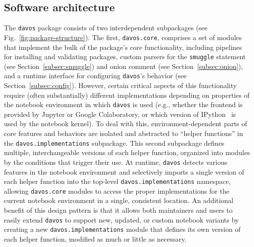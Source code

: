 \documentclass[preprint,12pt,a4paper]{elsarticle}
\newcommand{\comment}[1]{}
\begin{document}
\subsection{Software architecture}
The \texttt{davos} package consists of two interdependent subpackages (see Fig.~\ref{fig:package-structure}). The first, \texttt{davos.core}, comprises a set of modules that implement\comment{provide?} the bulk of the package's core functionality, including pipelines for installing and validating packages, custom parsers for the \texttt{smuggle} statement (see Section~\ref{subsec:smuggle}) and onion comment (see Section~\ref{subsec:onion}), and a runtime interface for configuring \texttt{davos}'s behavior (see Section~\ref{subsec:config}). However, certain critical\comment{other important} aspects of this functionality require (often substantially) different implementations depending on properties of the notebook environment in which \texttt{davos} is used (e.g., whether the frontend is provided by Jupyter or Google Colaboratory, or which version of IPython~\cite{PereGran07} is used by the notebook kernel). To deal with this, environment-dependent parts of core features and behaviors are isolated and abstracted to ``helper functions'' in the \texttt{davos.implementations} subpackage. This second subpackage defines multiple, interchangeable versions of each helper function, organized into modules by the conditions that trigger their use. At runtime, \texttt{davos} detects various features in the notebook environment and selectively imports a single version of each helper function into the top-level \texttt{davos.implementations} namespace, allowing \texttt{davos.core} modules to access the proper implementations for the current notebook environment in a single, consistent location. An additional benefit of this design pattern is that it allows both maintainers and users to easily extend \texttt{davos} to support new, updated, or custom notebook variants by creating a new \texttt{davos.implementations} module that defines its own version of each helper function, modified as much or little as necessary.

\comment{
- js_functions.py?
- how parser is registered and deregistered?
- stub files?
- test suite?
- packaged with new PEP \_\_\_ standard (pyproject.toml + setup.cfg; no setup.py)?
}
\end{document}
